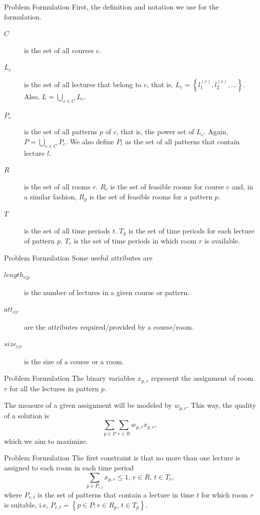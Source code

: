 \documentclass{beamer}
\begin{document}
\begin{frame}{Problem Formulation}
    First, the definition and notation we use for the formulation.

    \begin{description}
	\item[$C$] is the set of all courses $c$.
	\item[$L_c$] is the set of all lectures that belong to $c$, that is, $L_c = \left\{ l_1^{(c)}, l_2^{(c)},\ldots \right\} $. Also, $L = \dot{\bigcup}_{c\in C}  L_c$.
	\item[$P_c$] is the set of all patterns $p$ of $c$, that is, the power set of $L_c$. Again, $P = \dot{\bigcup}_{c\in C}  P_c$. We also define $P_l$ as the set of all patterns that contain lecture $l$.
	\item[$R$] is the set of all rooms $r$. $R_c$ is the set of feasible rooms for course $c$ and, in a similar fashion, $R_p$ is the set of feasible rooms for a pattern $p$.
	\item[$T$] is the set of all time periods $t$. $T_p$ is the set of time periods for each lecture of pattern $p$. $T_r$ is the set of time periods in which room $r$ is available.
    \end{description}
\end{frame}

\begin{frame}{Problem Formulation}
    Some useful attributes are
    \begin{description}
	\item[$length_{c|p} $] is the number of lectures in a given course or pattern.
	\item[$att_{c|r}$] are the attributes required/provided by a course/room.
	\item[$size_{c|r}$] is the size of a course or a room.
    \end{description}
\end{frame}

\begin{frame}{Problem Formulation}
    The binary variables $x_{p,r}$ represent the assignment of room $r$ for all the lectures in pattern $p$.

    The measure of a given assignment will be modeled by $w_{p,r}$. This way, the quality of a solution is \[
    \sum_{p \in P} \sum_{r\in R} w_{p,r}x_{p,r}
    ,\] which we aim to maximize.
\end{frame}

\begin{frame}{Problem Formulation}
    The first constraint is that no more than one lecture is assigned to each room in each time period \[
    \sum_{p \in P_{r,t}} x_{p,r} \le 1,\, r\in R,\,t\in T_r
    ,\] where $P_{r,t}$ is the set of patterns that contain a lecture in time $t$ for which room $r$ is suitable, i.e, $P_{r,t} = \left\{ p \in P : r \in R_p,\,t\in T_p \right\} $.
\end{frame}
\end{document}
